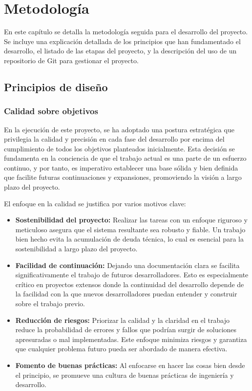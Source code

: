 \chapter{Metodología}

En este capítulo se detalla la metodología seguida para el desarrollo del proyecto. Se incluye una explicación detallada de los principios que han fundamentado el desarrollo, el listado de las etapas del proyecto, y la descripción del uso de un repositorio de Git para gestionar el proyecto.

\section{Principios de diseño}

\subsection{Calidad sobre objetivos}

En la ejecución de este proyecto, se ha adoptado una postura estratégica que privilegia la calidad y precisión en cada fase del desarrollo por encima del cumplimiento de todos los objetivos planteados inicialmente. Esta decisión se fundamenta en la conciencia de que el trabajo actual es una parte de un esfuerzo continuo, y por tanto, es imperativo establecer una base sólida y bien definida que facilite futuras continuaciones y expansiones, promoviendo la visión a largo plazo del proyecto.

El enfoque en la calidad se justifica por varios motivos clave:

\begin{itemize}
	\item \textbf{Sostenibilidad del proyecto:} Realizar las tareas con un enfoque riguroso y meticuloso asegura que el sistema resultante sea robusto y fiable. Un trabajo bien hecho evita la acumulación de deuda técnica, lo cual es esencial para la sostenibilidad a largo plazo del proyecto.
	
	\item \textbf{Facilidad de continuación:} Dejando una documentación clara se facilita significativamente el trabajo de futuros desarrolladores. Esto es especialmente crítico en proyectos extensos donde la continuidad del desarrollo depende de la facilidad con la que nuevos desarrolladores puedan entender y construir sobre el trabajo previo.
	
	\item \textbf{Reducción de riesgos:} Priorizar la calidad y la claridad en el trabajo reduce la probabilidad de errores y fallos que podrían surgir de soluciones apresuradas o mal implementadas. Este enfoque minimiza riesgos y garantiza que cualquier problema futuro pueda ser abordado de manera efectiva.
	
	\item \textbf{Fomento de buenas prácticas:} Al enfocarse en hacer las cosas bien desde el principio, se promueve una cultura de buenas prácticas de ingeniería y desarrollo.
	
\end{itemize}


